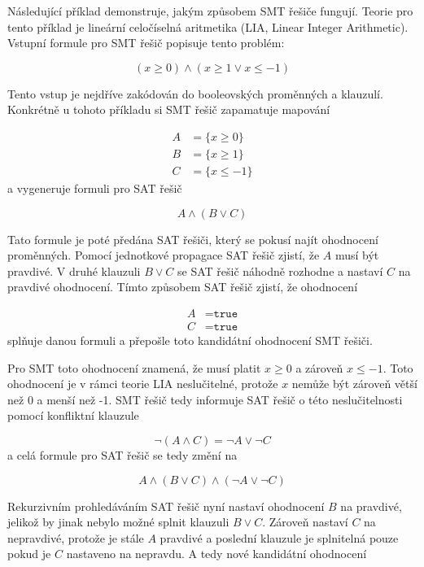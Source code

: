 Následující příklad demonstruje, jakým způsobem SMT řešiče fungují.
Teorie pro tento příklad je lineární celočíselná aritmetika (LIA, Linear Integer Arithmetic).
Vstupní formule pro SMT řešič popisuje tento problém:

\begin{equation*}
    (x \geq 0) \land (x \geq 1 \lor x \leq -1)
\end{equation*}

Tento vstup je nejdříve zakódován do booleovských proměnných a klauzulí.
Konkrétně u tohoto příkladu si SMT řešič zapamatuje mapování

\begin{align*}
    A &= \{ x \geq 0 \} \\
    B &= \{ x \geq 1 \} \\
    C &= \{ x \leq -1 \}
\end{align*}
a vygeneruje formuli pro SAT řešič

\begin{equation*}
    A \land (B \lor C)
\end{equation*}

Tato formule je poté předána SAT řešiči, který se pokusí najít ohodnocení proměnných.
Pomocí jednotkové propagace SAT řešič zjistí, že $A$ musí být pravdivé.
V druhé klauzuli $B \lor C$ se SAT řešič náhodně rozhodne a nastaví $C$ na pravdivé ohodnocení.
Tímto způsobem SAT řešič zjistí, že ohodnocení

\begin{align*}
    A &= \texttt{true} \\
    C &= \texttt{true}
\end{align*}
splňuje danou formuli a přepošle toto kandidátní ohodnocení SMT řešiči.

Pro SMT toto ohodnocení znamená, že musí platit $x \geq 0$ a zároveň $x \leq -1$.
Toto ohodnocení je v rámci teorie LIA neslučitelné, protože $x$ nemůže být zároveň větší než 0 a menší než -1.
SMT řešič tedy informuje SAT řešič o této neslučitelnosti pomocí konfliktní klauzule

\begin{equation*}
    \neg (A \land C) = \neg A \lor \neg C
\end{equation*}
a celá formule pro SAT řešič se tedy změní na

\begin{equation*}
    A \land (B \lor C) \land (\neg A \lor \neg C)
\end{equation*}

Rekurzivním prohledáváním SAT řešič nyní nastaví ohodnocení $B$ na pravdivé,
jelikož by jinak nebylo možné splnit klauzuli $B \lor C$.
Zároveň nastaví $C$ na nepravdivé,
protože je stále $A$ pravdivé a poslední klauzule je splnitelná
pouze pokud je $C$ nastaveno na nepravdu.
A tedy nové kandidátní ohodnocení

